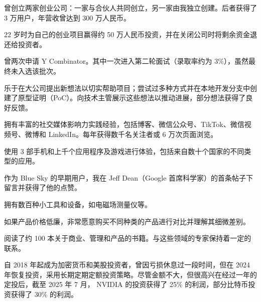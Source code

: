 
\begin{cventries}

  \cventry
    {} %
    {} %
    {} %
    {} %
    {
      \begin{cvitems}
        \item {曾创立两家创业公司：一家与合伙人共同创立，另一家由我独立创建。后者获得了 3 万用户，年营收曾达到 300 万人民币。}
        \item {22 岁时为自己的创业项目赢得约 50 万人民币投资，并在关闭公司时将剩余资金退还给投资者。}
        \item {曾两次申请 Y Combinator。其中一次进入第二轮面试（录取率约为 3\%），虽然最终未入选该批次。}
        \item {乐于在大公司提出新想法以切实帮助项目；尝试过多种方式并在本地开发分支中创建了原型证明（PoC）。向技术主管展示这些想法以推动进展，部分想法获得了良好反馈。}
        \item {拥有丰富的社交媒体影响力实践经验，包括博客、微信公众号、TikTok、微信视频号、微博和 LinkedIn。每年获得数千名关注者或 6 万次页面浏览。}
        \item {使用 3 部手机和上千个应用程序及游戏进行体验，包括来自数十个国家的不同类型的应用。}
        \item {作为 Blue Sky 的早期用户，我在 Jeff Dean（Google 首席科学家）的首条帖子下留言并获得了他的点赞。}
        \item {拥有数百种小工具和设备，如电磁场测量仪等。}
        \item {如果产品价格低廉，非常愿意购买不同种类的产品进行对比并理解其细微差别。}
        \item {阅读了约 100 本关于商业、管理和产品的书籍。与这些领域的专家保持着一定的联系。}
        \item {自 2018 年起成为加密货币和美股投资者，曾因亏损休息过一段时间，但在 2024 年恢复投资，采用长期定期定额投资策略。尽管金额不大，但很高兴在经过一年的定投后，截至 2025 年 7 月， NVIDIA 的投资获得了 25\% 的利润，部分比特币投资获得了 30\% 的利润。}
      \end{cvitems}
    }

\end{cventries}
